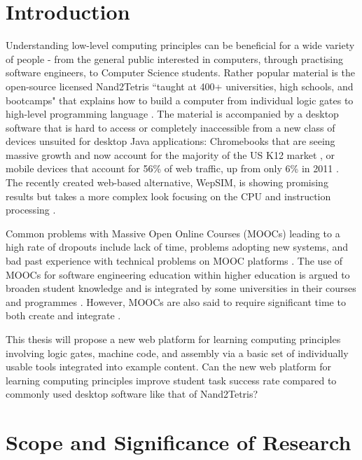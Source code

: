 \documentclass[a4paper,12pt]{report}
\begin{document}


\tableofcontents

\cleardoublepage

\section{Introduction}
\label{Introduction}

Understanding low-level computing principles can be beneficial for a wide variety of people - from the general public interested in computers, through practising software engineers, to Computer Science students.
Rather popular material is the open-source licensed Nand2Tetris ``taught at 400+ universities, high schools, and bootcamps" that explains how to build a computer from individual logic gates to high-level programming language \parencite{nand2tetrisweb}.
The material is accompanied by a desktop software that is hard to access or completely inaccessible from a new class of devices unsuited for desktop Java applications: Chromebooks that are seeing massive growth and now account for the majority of the US K12 market \parencite{Boreham_2019} \parencite{IDC_2021}, or mobile devices that account for 56\% of web traffic, up from only 6\% in 2011 \parencite{StatCounter_2021}.
The recently created web-based alternative, WepSIM, is showing promising results but takes a more complex look focusing on the CPU and instruction processing \parencite{garcia2019wepsim}.

Common problems with Massive Open Online Courses (MOOCs) leading to a high rate of dropouts include lack of time, problems adopting new systems, and bad past experience with technical problems on MOOC platforms \parencite{onah2014dropout}.
The use of MOOCs for software engineering education within higher education is argued to broaden student knowledge and is integrated by some universities in their courses and programmes \parencite{stikkolorum2014mooc}. However, MOOCs are also said to require significant time to both create and integrate \parencite{stikkolorum2014mooc}.

This thesis will propose a new web platform for learning computing principles involving logic gates, machine code, and assembly via a basic set of individually usable tools integrated into example content.
Can the new web platform for learning computing principles improve student task success rate compared to commonly used desktop software like that of Nand2Tetris?

\section{Scope and Significance of Research}
\end{document}
